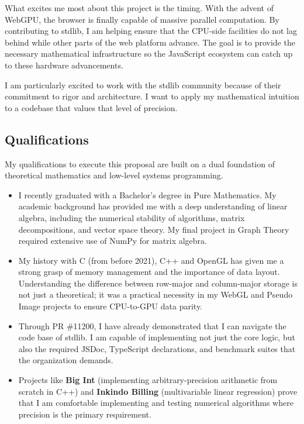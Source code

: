 \documentclass[
	a4paper,
	12pt
]{article}
\begin{document}
What excites me most about this project is the timing. With the advent of WebGPU, the browser is finally capable of massive parallel computation. By contributing to stdlib, I am helping ensure that the CPU-side facilities do not lag behind while other parts of the web platform advance. The goal is to provide the necessary mathematical infrastructure so the JavaScript ecosystem can catch up to these hardware advancements.

I am particularly excited to work with the stdlib community because of their commitment to rigor and architecture. I want to apply my mathematical intuition to a codebase that values that level of precision.

\subsection{Qualifications}

My qualifications to execute this proposal are built on a dual foundation of theoretical mathematics and low-level systems programming.

\begin{itemize}
	\item I recently graduated with a Bachelor's degree in Pure Mathematics. My academic background has provided me with a deep understanding of linear algebra, including the numerical stability of algorithms, matrix decompositions, and vector space theory. My final project in Graph Theory required extensive use of NumPy for matrix algebra.

	\item My history with C (from before 2021), C++ and OpenGL has given me a strong grasp of memory management and the importance of data layout. Understanding the difference between row-major and column-major storage is not just a theoretical; it was a practical necessity in my WebGL and Pseudo Image projects to ensure CPU-to-GPU data parity.

	\item Through PR \#11200, I have already demonstrated that I can navigate the code base of stdlib. I am capable of implementing not just the core logic, but also the required JSDoc, TypeScript declarations, and benchmark suites that the organization demands.

	\item Projects like \textbf{Big Int} (implementing arbitrary-precision arithmetic from scratch in C++) and \textbf{Inkindo Billing} (multivariable linear regression) prove that I am comfortable implementing and testing numerical algorithms where precision is the primary requirement.
\end{itemize}
\end{document}

